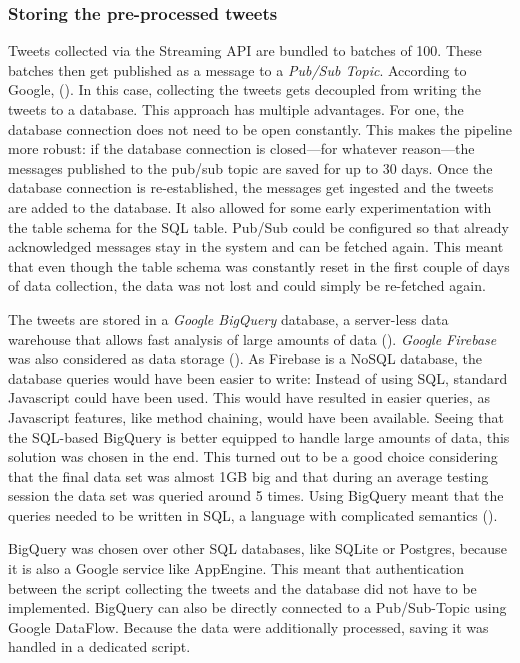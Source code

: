 \subsubsection{Storing the pre-processed tweets}
Tweets collected via the Streaming API are bundled to batches of 100. These batches then get published as a message to a \emph{Pub/Sub Topic}. According to Google,  (\cite{google2020a}). In this case, collecting the tweets gets decoupled from writing the tweets to a database. This approach has multiple advantages. For one, the database connection does not need to be open constantly. This makes the pipeline more robust: if the database connection is closed---for whatever reason---the messages published to the pub/sub topic are saved for up to 30 days. Once the database connection is re-established, the messages get ingested and the tweets are added to the database. It also allowed for some early experimentation with the table schema for the SQL table. Pub/Sub could be configured so that already acknowledged messages stay in the system and can be fetched again. This meant that even though the table schema was constantly reset in the first couple of days of data collection, the data was not lost and could simply be re-fetched again.

The tweets are stored in a \emph{Google BigQuery} database, a server-less data warehouse that allows fast analysis of large amounts of data (\cite{google2020b}). \emph{Google Firebase} was also considered as data storage (\cite{google2020c}). As Firebase is a NoSQL database, the database queries would have been easier to write: Instead of using SQL, standard Javascript could have been used. This would have resulted in easier queries, as Javascript features, like method chaining, would have been available. Seeing that the SQL-based BigQuery is better equipped to handle large amounts of data, this solution was chosen in the end. This turned out to be a good choice considering that the final data set was almost 1GB big and that during an average testing session the data set was queried around 5 times. Using BigQuery meant that the queries needed to be written in SQL, a language with complicated semantics (\cite{slutz1998massive}).

BigQuery was chosen over other SQL databases, like SQLite or Postgres, because it is also a Google service like AppEngine. This meant that authentication between the script collecting the tweets and the database did not have to be implemented. BigQuery can also be directly connected to a Pub/Sub-Topic using Google DataFlow. Because the data were additionally processed, saving it was handled in a dedicated script. 

